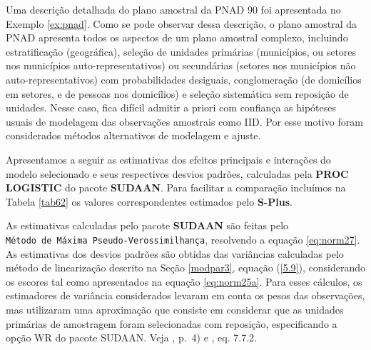 \documentclass[]{book}
\begin{document}
Uma descrição detalhada do plano amostral da PNAD 90 foi apresentada no
Exemplo \ref{ex:pnad}. Como se pode observar dessa descrição, o plano
amostral da PNAD apresenta todos os aspectos de um plano amostral
complexo, incluindo estratificação (geográfica), seleção de unidades
primárias (municípios, ou setores nos municípios auto-representativos)
ou secundárias (setores nos municípios não auto-representativos) com
probabilidades desiguais, conglomeração (de domicílios em setores, e de
pessoas nos domicílios) e seleção sistemática sem reposição de unidades.
Nesse caso, fica difícil admitir a priori com confiança as hipóteses
usuais de modelagem das observações amostrais como IID. Por esse motivo
foram considerados métodos alternativos de modelagem e ajuste.

Apresentamos a seguir as estimativas dos efeitos principais e interações
do modelo selecionado e seus respectivos desvios padrões, calculadas
pela \textbf{PROC LOGISTIC} do pacote \textbf{SUDAAN}. Para facilitar a
comparação incluímos na Tabela \ref{tab62} os valores correspondentes
estimados pelo \textbf{S-Plus}.

As estimativas calculadas pelo pacote \textbf{SUDAAN} são feitas pelo
\texttt{Método\ de\ Máxima\ Pseudo-Verossimilhança}, resolvendo a
equação \eqref{eq:norm27}. As estimativas dos desvios padrões são obtidas
das variâncias calculadas pelo método de linearização descrito na Seção
\ref{modpar3}, equação (\ref{5.9}), considerando os escores tal como
apresentados na equação \eqref{eq:norm25a}. Para esses cálculos, os
estimadores de variância considerados levaram em conta os pesos das
observações, mas utilizaram uma aproximação que consiste em considerar
que as unidades primárias de amostragem foram selecionadas com
reposição, especificando a opção WR do pacote SUDAAN. Veja
\citep{SUDAAN92}, p.~4) e \citep{W85}, eq. 7.7.2.
\end{document}

